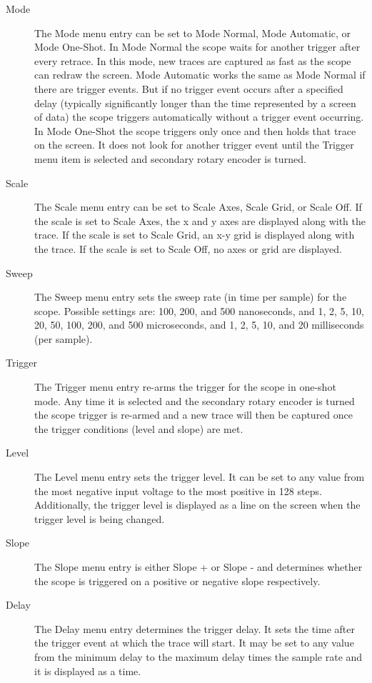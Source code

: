 \documentclass[12pt]{refart} %
\begin{document}
\begin{description}
	\item[Mode]The Mode menu entry can be set to Mode Normal, Mode Automatic, or Mode One-Shot. In Mode Normal the scope waits for another trigger after every retrace. In this mode, new traces are captured as fast as the scope can redraw the screen. Mode Automatic works the same as Mode Normal if there are trigger events. But if no trigger event occurs after a specified delay (typically significantly longer than the time represented by a screen of data) the scope triggers automatically without a trigger event occurring. In Mode One-Shot the scope triggers only once and then holds that trace on the screen. It does not look for another trigger event until the Trigger menu item is selected and secondary rotary encoder is turned.
	
	\item[Scale] The Scale menu entry can be set to Scale Axes, Scale Grid, or Scale Off. If the scale is set to Scale Axes, the x and y axes are displayed along with the trace. If the scale is set to Scale Grid, an x-y grid is displayed along with the trace. If the scale is set to Scale Off, no axes or grid are displayed.
	
	\item[Sweep] The Sweep menu entry sets the sweep rate (in time per sample) for the scope. Possible settings are: 100, 200, and 500 nanoseconds, and 1, 2, 5, 10, 20, 50, 100, 200, and 500 microseconds, and 1, 2, 5, 10, and 20 milliseconds (per sample).
	
	\item[Trigger] The Trigger menu entry re-arms the trigger for the scope in one-shot mode. Any time it is selected and the secondary rotary encoder is turned the scope trigger is re-armed and a new trace will then be captured once the trigger conditions (level and slope) are met.
	
	\item[Level] The Level menu entry sets the trigger level. It can be set to any value from the most negative input voltage to the most positive in 128 steps. Additionally, the trigger level is displayed as a line on the screen when the trigger level is being changed.
	
	\item[Slope] The Slope menu entry is either Slope + or Slope - and determines whether the scope is triggered on a positive or negative slope respectively.
	
	\item[Delay] The Delay menu entry determines the trigger delay. It sets the time after the trigger event at which the trace will start. It may be set to any value from the minimum delay to the maximum delay times the sample rate and it is displayed as a time.
\end{description}
\end{document}
